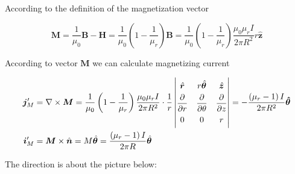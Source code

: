 \documentclass[a4paper,11pt]{amsart}
\theoremstyle{definition}
\begin{document}
	According to the definition of the magnetization vector
	
	$$
	\boldsymbol{M}=\frac{1}{\mu _0}\boldsymbol{B}-\boldsymbol{H}=\dfrac{1}{\mu_0}\left( 1-\dfrac{1}{\mu_r} \right)\bm{B} = \dfrac{1}{\mu_0}\left( 1-\dfrac{1}{\mu_r} \right)\frac{\mu _0\mu _rI}{2\pi R^2}r\bm{\hat{z}}
	$$
	
	According to vector $\bm{M}$ we can calculate magnetizing current
	
	\begin{align}
		\begin{aligned}
			\bm{j}_{M}^{\prime} &= \nabla \times \boldsymbol{M} = \frac{1}{\mu _0}\left( 1-\frac{1}{\mu _r} \right) \frac{\mu _0\mu _r I}{2\pi R^2}\cdot \frac{1}{r}\left| \begin{matrix}
				\hat{\boldsymbol{r}} & r\hat{\boldsymbol{\theta}} & \hat{\boldsymbol{z}} \vphantom{\dfrac{1}{1}} \\
				\dfrac{\partial}{\partial r} & \dfrac{\partial}{\partial \theta} & \dfrac{\partial}{\partial z} \\
				0 & 0 & r \vphantom{\dfrac{1}{1}} \\
			\end{matrix} \right| = -\frac{\left( \mu _r-1 \right) I}{2\pi R^2}\bm{\hat{\theta}} \\
			\boldsymbol{i}_{M}^{\prime} &= \boldsymbol{M}\times \hat{\boldsymbol{n}} = M\hat{\boldsymbol{\theta}} = \frac{\left( \mu _r-1 \right) I}{2\pi R}\hat{\boldsymbol{\theta}}
		\end{aligned}
	\end{align}
	
	The direction is about the picture below:
	
\end{document}

